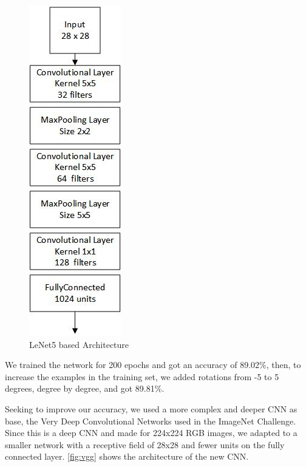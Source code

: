 \documentclass[twoside,twocolumn]{article}
\begin{document}
    \begin{figure}[h]
    \begin{center}
        \includegraphics[scale=0.8]{lenet5Arch.jpg}
        \caption{LeNet5 based Architecture\label{fig:lenet5}}
    \end{center}
    \end{figure}
    
    
    We trained the network for 200 epochs and got an accuracy of 89.02\%, then, to increase the examples in the training set, we added rotations from -5 to 5 degrees, degree by degree, and got 89.81\%.
    
    Seeking to improve our accuracy, we used a more complex and deeper CNN as base, the Very Deep Convolutional Networks \cite{DBLP:journals/corr/SimonyanZ14a} used in the  ImageNet Challenge. Since this is a deep CNN and made for 224x224 RGB images, we adapted to a smaller network with a receptive field of 28x28 and fewer units on the fully connected layer. \ref{fig:vgg} shows the architecture of the new CNN.
    
\end{document}
